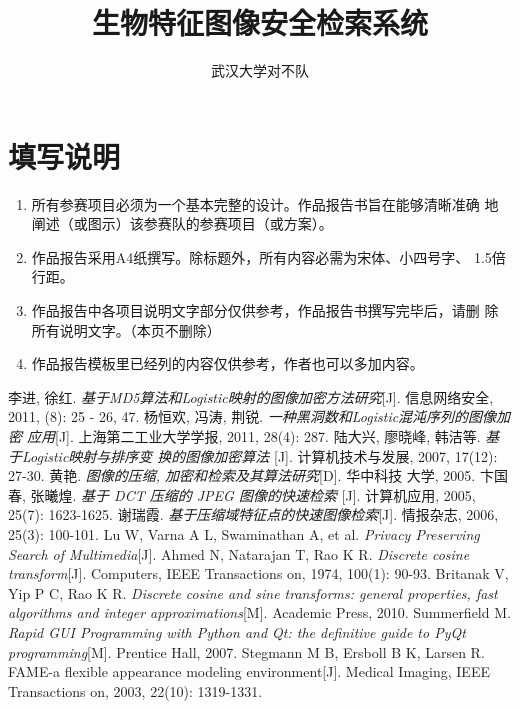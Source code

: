 \documentclass[utf8, 12pt, titlepage, a4paper]{ctexrep}
\author{武汉大学对不队}
\title{生物特征图像安全检索系统}
\begin{document}


\section*{填写说明}
\begin{enumerate}
\item 所有参赛项目必须为一个基本完整的设计。作品报告书旨在能够清晰准确
  地阐述（或图示）该参赛队的参赛项目（或方案）。
\item 作品报告采用A4纸撰写。除标题外，所有内容必需为宋体、小四号字、
  1.5倍行距。
\item 作品报告中各项目说明文字部分仅供参考，作品报告书撰写完毕后，请删
  除所有说明文字。（本页不删除）
\item 作品报告模板里已经列的内容仅供参考，作者也可以多加内容。
\end{enumerate}

\tableofcontents







\begin{thebibliography}{9}
 李进, 徐红.
 \emph{基于MD5算法和Logistic映射的图像加密方法研究}[J]. 信息网络安全,
 2011, (8): 25 - 26, 47.
 杨恒欢, 冯涛, 荆锐. \emph{一种黑洞数和Logistic混沌序列的图像加密
  应用}[J]. 上海第二工业大学学报, 2011, 28(4): 287.
 陆大兴, 廖晓峰, 韩洁等. \emph{基于Logistic映射与排序变
    换的图像加密算法}
[J]. 计算机技术与发展, 2007, 17(12): 27-30.
 黄艳. \emph{图像的压缩, 加密和检索及其算法研究}[D]. 华中科技
  大学, 2005.
 卞国春, 张曦煌. \emph{基于 DCT 压缩的 JPEG 图像的快速检索}
  [J]. 计算机应用, 2005, 25(7): 1623-1625.
 谢瑞霞. \emph{基于压缩域特征点的快速图像检索}[J]. 情报杂志,
  2006, 25(3): 100-101.
 Lu W, Varna A L, Swaminathan A, et al. \emph{Privacy
    Preserving Search of Multimedia}[J].
 Ahmed N, Natarajan T, Rao K R. \emph{Discrete cosine
    transform}[J]. Computers, IEEE Transactions on, 1974, 100(1):
  90-93.
 Britanak V, Yip P C, Rao K R. \emph{Discrete cosine and sine
  transforms: general properties, fast algorithms and integer
  approximations}[M]. Academic Press, 2010.
 Summerfield M. \emph{Rapid GUI Programming with Python
    and Qt: the definitive guide to PyQt programming}[M]. Prentice
  Hall, 2007.
 Stegmann M B, Ersboll B K, Larsen R. FAME-a flexible
  appearance modeling environment[J]. Medical Imaging, IEEE
  Transactions on, 2003, 22(10): 1319-1331.
\end{thebibliography}
\end{document}
